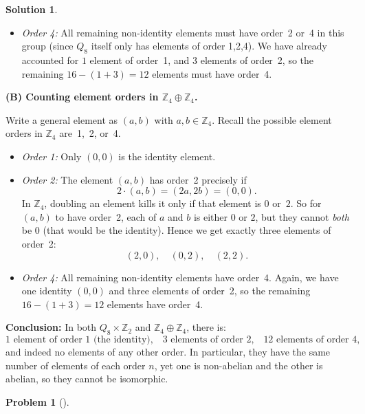 \documentclass[12pt]{article}
\theoremstyle{definition} %
\newtheorem{solution}{Solution}
\newtheorem{problem}{Problem}
\theoremstyle{plain} %
\begin{document}
\begin{solution}
\begin{itemize}
\item 
\emph{Order 4:} 
All remaining non-identity elements must have order~2 or~4 in this group 
(since \(Q_8\) itself only has elements of order 1,2,4).  
We have already accounted for \(1\) element of order~1, 
and \(3\) elements of order~2, so the remaining \(16 - (1+3)=12\) 
elements must have order~4.  
\end{itemize}

\bigskip
\noindent
\textbf{(B) Counting element orders in \(\mathbb{Z}_4\oplus \mathbb{Z}_4\).}

Write a general element as \((a,b)\) with \(a,b\in \mathbb{Z}_4\).
Recall the possible element orders in \(\mathbb{Z}_4\) are~1,~2, or~4.

\begin{itemize}
\item 
\emph{Order 1:} 
Only \((0,0)\) is the identity element.

\item
\emph{Order 2:}
The element \((a,b)\) has order~2 precisely if 
\[
2\cdot(a,b) = (2a,2b) = (0,0).
\]
In \(\mathbb{Z}_4\), doubling an element kills it only if that element 
is \(0\) or~\(2\).  So for \((a,b)\) to have order~2, 
each of \(a\) and \(b\) is either \(0\) or \(2\), 
but they cannot \emph{both} be \(0\) (that would be the identity).  
Hence we get exactly three elements of order~2:
\[
(2,0),\quad (0,2),\quad (2,2).
\]

\item
\emph{Order 4:}
All remaining non-identity elements have order~4.  
Again, we have one identity \((0,0)\) and three elements of order~2, 
so the remaining \(16-(1+3)=12\) elements have order~4.
\end{itemize}

\bigskip
\noindent
\textbf{Conclusion:}  
In both \(Q_8\times \mathbb{Z}_2\) and \(\mathbb{Z}_4\oplus \mathbb{Z}_4\), 
there is:
\[
1\text{ element of order 1 (the identity),} 
\quad
3\text{ elements of order 2,} 
\quad
12\text{ elements of order 4,}
\]
and indeed no elements of any other order.  In particular, 
they have the same number of elements of each order \(n\), yet 
one is non-abelian and the other is abelian, so they 
cannot be isomorphic.
\end{solution}
\begin{problem}[]
    
\end{problem}
\end{document}
